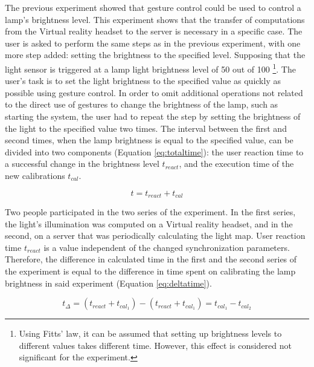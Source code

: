The previous experiment showed that gesture control could be used to control a lamp's brightness level. This experiment shows that the transfer of computations from the Virtual reality headset to the server is necessary in a specific case. The user is asked to perform the same steps as in the previous experiment, with one more step added:  setting the brightness to the specified level. Supposing that the light sensor is triggered at a lamp light brightness level of 50 out of 100 \footnote{Using Fitts' law, it can be assumed that setting up brightness levels to different values takes different time. However, this effect is considered not significant for the experiment.}. The user's task is to set the light brightness to the specified value as quickly as possible using gesture control. In order to omit additional operations not related to the direct use of gestures to change the brightness of the lamp, such as starting the system, the user had to repeat the step by setting the brightness of the light to the specified value two times. The interval between the first and second times, when the lamp brightness is equal to the specified value, can be divided into two components (Equation \eqref{eq:totaltime}): the user reaction time to a successful change in the brightness level $ t_{react} $, and the execution time of the new calibrations $ t_{cal} $.


\begin{equation}
  t = t_{react} + t_{cal}
  \label{eq:totaltime}
\end{equation}

Two people participated in the two series of the experiment. In the first series, the light's illumination was computed on a Virtual reality headset, and in the second, on a server that was periodically calculating the light map. User reaction time $ t_{react} $ is a value independent of the changed synchronization parameters. Therefore, the difference in calculated time in the first and the second series of the experiment is equal to the difference in time spent on calibrating the lamp brightness in said experiment (Equation \eqref{eq:deltatime}).

\begin{equation}
  t _{\Delta} = (t_{react} + t_{cal_1}) - (t_{react} + t_{cal_1}) = t_{cal_1} - t_{cal_2}
  \label{eq:deltatime}
\end{equation}

